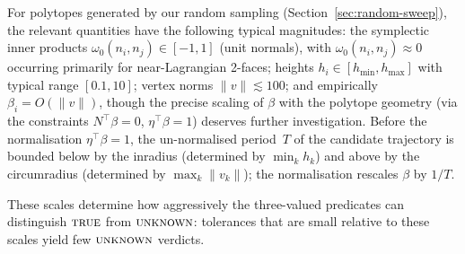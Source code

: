 \begin{remark}\label{rem:v2-parameter-scales}
For polytopes generated by our random sampling
(Section~\ref{sec:random-sweep}),
the relevant quantities have the following typical magnitudes:
the symplectic inner products
$\omega_0(n_i, n_j) \in [-1, 1]$ (unit normals),
with $\omega_0(n_i, n_j) \approx 0$ occurring primarily
for near-Lagrangian 2-faces;
heights $h_i \in [h_{\min}, h_{\max}]$ with typical range
$[0.1, 10]$;
vertex norms $\|v\| \lesssim 100$;
and empirically $\beta_i = O(\|v\|)$, though the precise
scaling of $\beta$ with the polytope geometry (via the
constraints $N^\top \beta = 0$, $\eta^\top \beta = 1$)
deserves further investigation.
Before the normalisation $\eta^\top \beta = 1$,
the un-normalised period~$T$ of the candidate trajectory is bounded below
by the inradius (determined by $\min_k h_k$) and above by
the circumradius (determined by $\max_k \|v_k\|$);
the normalisation rescales $\beta$ by $1/T$.

These scales determine how aggressively the three-valued
predicates can distinguish $\textsc{true}$ from
$\textsc{unknown}$:
tolerances that are small relative to these scales yield
few $\textsc{unknown}$ verdicts.
\end{remark}
